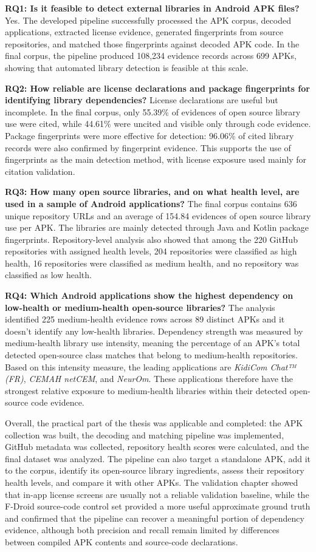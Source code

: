 \documentclass[12pt,a4paper]{report}
\begin{document}
\textbf{RQ1: Is it feasible to detect external libraries in Android APK files?}
Yes. The developed pipeline successfully processed the APK corpus, decoded applications, extracted license evidence, generated fingerprints from source repositories, and matched those fingerprints against decoded APK code. In the final corpus, the pipeline produced 108,234 evidence records across 699 APKs, showing that automated library detection is feasible at this scale.

\textbf{RQ2: How reliable are license declarations and package fingerprints for identifying library dependencies?}
License declarations are useful but incomplete. In the final corpus, only 55.39\% of evidences of open source library use were cited, while 44.61\% were uncited and visible only through code evidence. Package fingerprints were more effective for detection: 96.06\% of cited library records were also confirmed by fingerprint evidence. This supports the use of fingerprints as the main detection method, with license exposure used mainly for citation validation.

\textbf{RQ3: How many open source libraries, and on what health level, are used in a sample of Android applications?}
The final corpus contains 636 unique repository URLs and an average of 154.84 evidences of open source library use per APK. The libraries are mainly detected through Java and Kotlin package fingerprints. Repository-level analysis also showed that among the 220 GitHub repositories with assigned health levels, 204 repositories were classified as high health, 16 repositories were classified as medium health, and no repository was classified as low health.

\textbf{RQ4: Which Android applications show the highest dependency on low-health or medium-health open-source libraries?}
The analysis identified 225 medium-health evidence rows across 89 distinct APKs and it doesn't identify any low-health libraries. Dependency strength was measured by medium-health library use intensity, meaning the percentage of an APK's total detected open-source class matches that belong to medium-health repositories. Based on this intensity measure, the leading applications are \textit{KidiCom Chat™ (FR)}, \textit{CEMAH netCEM}, and \textit{NeurOm}. These applications therefore have the strongest relative exposure to medium-health libraries within their detected open-source code evidence.

Overall, the practical part of the thesis was applicable and completed: the APK collection was built, the decoding and matching pipeline was implemented, GitHub metadata was collected, repository health scores were calculated, and the final dataset was analyzed. The pipeline can also target a standalone APK, add it to the corpus, identify its open-source library ingredients, assess their repository health levels, and compare it with other APKs. The validation chapter showed that in-app license screens are usually not a reliable validation baseline, while the F-Droid source-code control set provided a more useful approximate ground truth and confirmed that the pipeline can recover a meaningful portion of dependency evidence, although both precision and recall remain limited by differences between compiled APK contents and source-code declarations.
\end{document}
